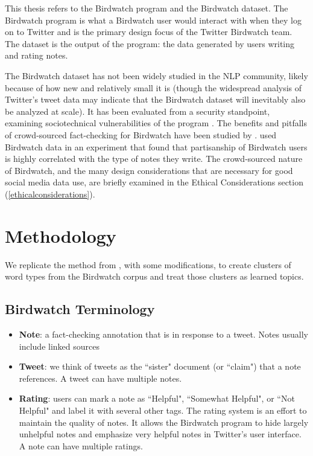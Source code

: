 \documentclass [11pt, proquest] {uwthesis}[2020/02/24]
\begin{document}
This thesis refers to the Birdwatch program and
the Birdwatch dataset. The Birdwatch program is
what a Birdwatch user would interact with when
they log on to Twitter and is the primary design
focus of the Twitter Birdwatch team. The dataset is
the output of the program: the data generated by
users writing and rating notes.

The Birdwatch dataset has not been widely studied in the NLP community, likely because of how new and relatively small it is (though the widespread analysis of Twitter's tweet data \citep{antonakaki2021survey} may indicate that the Birdwatch dataset will inevitably also be analyzed at scale). It has been evaluated from a security standpoint, examining sociotechnical vulnerabilities of the program \citep{benjamin2021watches}. The benefits and pitfalls of crowd-sourced fact-checking for Birdwatch have been studied by \cite{yasseri2021can}. \cite{allen2021birds} used Birdwatch data in an experiment that found that partisanship of Birdwatch users is highly correlated with the type of notes they write. The crowd-sourced nature of Birdwatch, and the many design considerations that are necessary for good social media data use, are briefly examined in the Ethical Considerations section (\ref{ethicalconsiderations}).





\chapter{Methodology}

We replicate the method from \cite{sia-etal-2020-tired}, with some modifications, to create clusters of word types from the Birdwatch corpus and treat those clusters as learned topics.

\section{Birdwatch Terminology}


\begin{itemize}
\item \textbf{Note}: a fact-checking annotation that is in response to a tweet. Notes usually include linked sources
\item \textbf{Tweet}: we think of tweets as the ``sister" document (or ``claim") that a note references. A tweet can have multiple notes.
\item \textbf{Rating}: users can mark a note as ``Helpful", ``Somewhat Helpful", or ``Not Helpful" and label it with several other tags. The rating system is an effort to maintain the quality of notes. It allows the Birdwatch program to hide largely unhelpful notes and emphasize very helpful notes in Twitter's user interface. A note can have multiple ratings.
\end{itemize}
\end{document}
